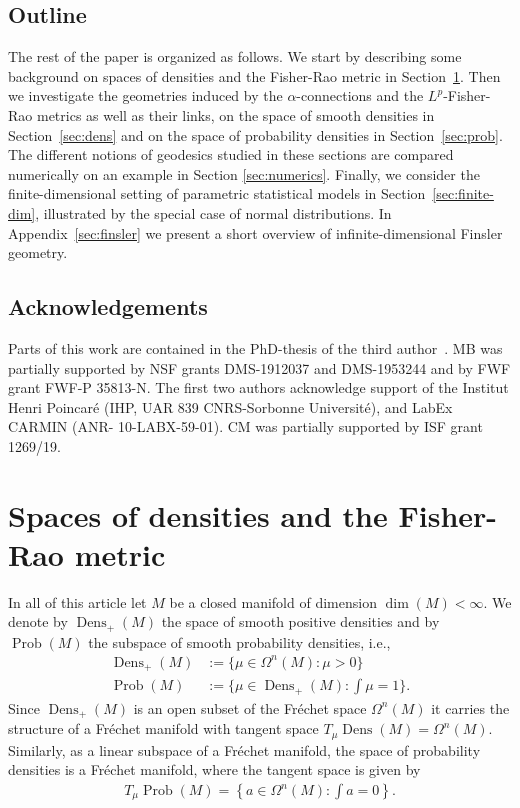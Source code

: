 \documentclass[11pt]{amsart}
\theoremstyle{definition}
\newcommand{\Prob}{\operatorname{Prob}(M)}
\newcommand{\Dens}{\operatorname{Dens}_+(M)}
\begin{document}
\subsection{Outline}

The rest of the paper is organized as follows. We start  by describing some background on spaces of densities and the Fisher-Rao metric in Section~\ref{sec:background}. Then we investigate the geometries induced by the $\alpha$-connections and the $L^p$-Fisher-Rao metrics as well as their links, on the space of smooth densities in Section~\ref{sec:dens} and on the space of probability densities in Section~\ref{sec:prob}. The different notions of geodesics studied in these sections are compared numerically on an example in Section \ref{sec:numerics}. Finally, we consider the finite-dimensional setting of parametric statistical models in Section~\ref{sec:finite-dim}, illustrated by the special case of normal distributions.
In Appendix~\ref{sec:finsler} we present a short overview of infinite-dimensional Finsler geometry.

\subsection*{Acknowledgements}
Parts of this work are contained in the PhD-thesis of the third author~\cite{Lu_thesis2023}.
MB was partially supported
by NSF grants DMS-1912037 and DMS-1953244 and by FWF grant FWF-P 35813-N. The first two authors acknowledge support of the Institut Henri Poincar{\'e} (IHP, UAR 839 CNRS-Sorbonne Universit{\'e}), and LabEx CARMIN (ANR-
10-LABX-59-01).
CM was partially supported by ISF grant 1269/19.


\section{Spaces of densities and the Fisher-Rao metric}\label{sec:background}

In all of this article let $M$ be a closed manifold of dimension $\operatorname{dim}(M)<\infty$. 
We denote by $\Dens$ the space of smooth positive densities and by $\Prob$ the subspace of smooth probability densities, i.e., 
\begin{align*}
\Dens&:=\{\mu\in \Omega^n(M) : \mu>0\}\\
\Prob&:=\{\mu\in \Dens : \int\mu=1\}.
\end{align*}
Since $\Dens$ is an open subset of the Fr\'echet space $\Omega^n(M)$ it carries the structure of a Fr\'echet manifold with tangent space $T_{\mu}\operatorname{Dens}(M)=\Omega^n(M)$.
Similarly, as a linear subspace of a Fr\'echet manifold,  the space of probability densities is a Fr\'echet manifold, where the tangent space is given by 
\begin{align*}
T_{\mu}\Prob=\left\{a \in \Omega^n(M):\int a=0\right\}.
\end{align*}
\end{document}
